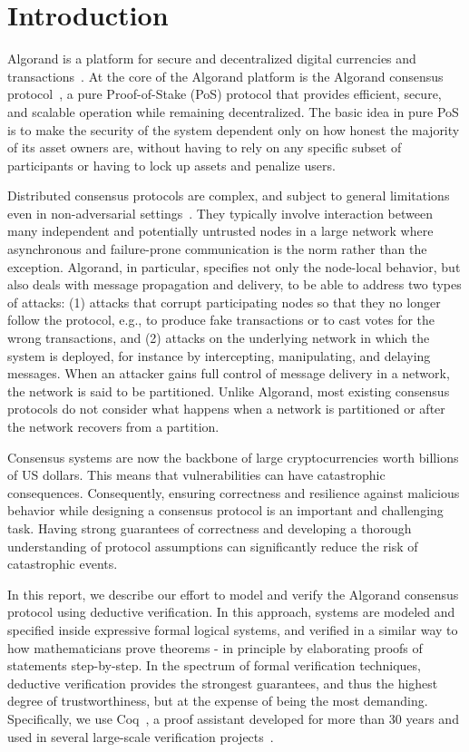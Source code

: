\section{Introduction}

Algorand is a platform for secure and decentralized digital currencies and transactions~\cite{Micali2019}. At the core of the Algorand platform is the Algorand consensus protocol~\cite{Chen2018,Chen2019}, a pure Proof-of-Stake (PoS) protocol that provides efficient, secure, and scalable operation while remaining decentralized. The basic idea in pure PoS is to make the security of the system dependent only on how honest the majority of its asset owners are, without having to rely on any specific subset of participants or having to lock up assets and penalize users.

Distributed consensus protocols are complex, and subject to general limitations even in non-adversarial settings~\cite{Fischer1985}. They typically involve interaction between many independent and potentially untrusted nodes in a large network where asynchronous and failure-prone communication is the norm rather than the exception.
Algorand, in particular, specifies not only the node-local behavior, but also deals with message propagation and delivery, to be able to address two types of attacks: (1) attacks that corrupt participating nodes so that they no longer follow the protocol, e.g., to produce fake transactions or to cast votes for the wrong transactions, and (2) attacks on the underlying network in which the system is deployed, for instance by intercepting, manipulating, and delaying messages. When an attacker gains full control of message delivery in a network, the network is said to be partitioned. Unlike Algorand, most existing consensus protocols do not consider what happens when a network is partitioned or after the network recovers from a partition.

Consensus systems are now the backbone of large cryptocurrencies worth billions of US dollars. This means that vulnerabilities can have catastrophic consequences. Consequently, ensuring correctness and resilience against malicious behavior while designing a consensus protocol is an important and challenging task. Having strong guarantees of correctness and developing a thorough understanding of protocol assumptions can significantly reduce the risk of catastrophic events.

In this report, we describe our effort to model and verify the Algorand consensus protocol using deductive verification. In this approach, systems are modeled and specified inside expressive formal logical systems, and verified in a similar way to how mathematicians prove theorems - in principle by elaborating proofs of statements step-by-step. In the spectrum of formal verification techniques, deductive verification provides the strongest guarantees, and thus the highest degree of trustworthiness, but at the expense of being the most demanding. Specifically, we use Coq~\cite{CoqArt}, a proof assistant developed for more than 30 years and used in several large-scale verification projects~\cite{Leroy2009,Woos2016}.

